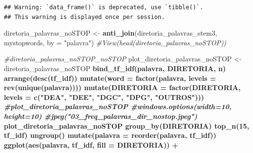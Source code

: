 \documentclass[]{article}
\newenvironment{Shaded}{\begin{snugshade}}{\end{snugshade}}
\newcommand{\KeywordTok}[1]{\textcolor[rgb]{0.13,0.29,0.53}{\textbf{#1}}}
\newcommand{\DataTypeTok}[1]{\textcolor[rgb]{0.13,0.29,0.53}{#1}}
\newcommand{\DecValTok}[1]{\textcolor[rgb]{0.00,0.00,0.81}{#1}}
\newcommand{\StringTok}[1]{\textcolor[rgb]{0.31,0.60,0.02}{#1}}
\newcommand{\CommentTok}[1]{\textcolor[rgb]{0.56,0.35,0.01}{\textit{#1}}}
\newcommand{\OperatorTok}[1]{\textcolor[rgb]{0.81,0.36,0.00}{\textbf{#1}}}
\newcommand{\NormalTok}[1]{#1}
\begin{document}
\begin{verbatim}
## Warning: `data_frame()` is deprecated, use `tibble()`.
## This warning is displayed once per session.
\end{verbatim}

\begin{Shaded}
\begin{Highlighting}[]
\NormalTok{diretoria_palavras_noSTOP <-}\StringTok{ }\KeywordTok{anti_join}\NormalTok{(diretoria_palavras_stem3, mystopwords, }\DataTypeTok{by =} \StringTok{"palavra"}\NormalTok{)}
\CommentTok{#View(head(diretoria_palavras_noSTOP))}
\end{Highlighting}
\end{Shaded}

\begin{Shaded}
\begin{Highlighting}[]
\CommentTok{#diretoria_palavras_noSTOP_noSTOP}
\NormalTok{plot_diretoria_palavras_noSTOP <-}\StringTok{ }\NormalTok{diretoria_palavras_noSTOP }\OperatorTok{%
\StringTok{  }\KeywordTok{bind_tf_idf}\NormalTok{(palavra, DIRETORIA, n) }\OperatorTok{%
\StringTok{  }\KeywordTok{arrange}\NormalTok{(}\KeywordTok{desc}\NormalTok{(tf_idf)) }\OperatorTok{%
\StringTok{  }\KeywordTok{mutate}\NormalTok{(}\DataTypeTok{word =} \KeywordTok{factor}\NormalTok{(palavra, }\DataTypeTok{levels =} \KeywordTok{rev}\NormalTok{(}\KeywordTok{unique}\NormalTok{(palavra)))) }\OperatorTok{%
\StringTok{  }\KeywordTok{mutate}\NormalTok{(}\DataTypeTok{DIRETORIA =} \KeywordTok{factor}\NormalTok{(DIRETORIA, }\DataTypeTok{levels =} \KeywordTok{c}\NormalTok{(}\StringTok{"DEA"}\NormalTok{,}
                                                  \StringTok{"DEE"}\NormalTok{,}
                                                  \StringTok{"DGC"}\NormalTok{,}
                                                  \StringTok{"DPG"}\NormalTok{,}
                                                  \StringTok{"OUTROS"}\NormalTok{)))}
\CommentTok{#plot_diretoria_palavras_noSTOP}
\CommentTok{#windows.options(width=10, height=10)}
\CommentTok{#jpeg("03_freq_palavras_dir_nostop.jpeg")}
\NormalTok{plot_diretoria_palavras_noSTOP }\OperatorTok{%
\KeywordTok{group_by}\NormalTok{(DIRETORIA) }\OperatorTok{%
\KeywordTok{top_n}\NormalTok{(}\DecValTok{15}\NormalTok{, tf_idf) }\OperatorTok{%
\KeywordTok{ungroup}\NormalTok{() }\OperatorTok{%
\KeywordTok{mutate}\NormalTok{(}\DataTypeTok{palavra =} \KeywordTok{reorder}\NormalTok{(palavra, tf_idf)) }\OperatorTok{%
\KeywordTok{ggplot}\NormalTok{(}\KeywordTok{aes}\NormalTok{(palavra, tf_idf, }\DataTypeTok{fill =}\NormalTok{ DIRETORIA)) }\OperatorTok{+}
}}}}}}}}}
\end{Highlighting}
\end{Shaded}
\end{document}
